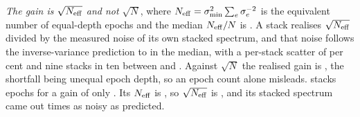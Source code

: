 \emph{The gain is $\sqrt{N_{\rm eff}}$ and not $\sqrt{N}$}, where
$N_{\rm eff}=\sigma_{\min}^{2}\sum_e\sigma_e^{-2}$ is the equivalent number of
equal-depth epochs and the median $N_{\rm eff}/N$ is \StkNeffFrac. A
stack realises $\sqrt{N_{\rm eff}}$ divided by the measured noise of its
own stacked spectrum, and that noise follows the inverse-variance prediction
to \StkGainVsNeff{} in the median, with a per-stack scatter of
\StkMadZScatterPct{} per cent and nine stacks in ten between \SzNoiseLo{} and
\SzNoiseHi. Against $\sqrt{N}$ the realised gain is \StkGainVsN, the
shortfall being unequal epoch depth, so an epoch count alone misleads.
\StkWorstStar{} stacks \StkWorstN{} epochs for a gain of only
\StkWorstGain. Its $N_{\rm eff}$ is \StkWorstNeff, so
$\sqrt{N_{\rm eff}}$ is \SzWorstSqrtNeff, and its stacked spectrum came out
\SzWorstNoise{} times as noisy as predicted.

